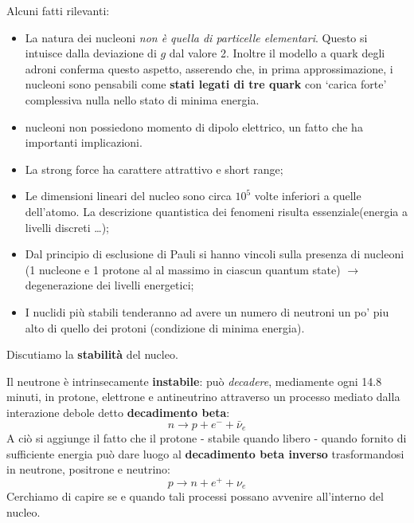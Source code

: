 Alcuni fatti rilevanti:
\begin{itemize}
    \item La natura dei nucleoni \emph{non è quella di particelle elementari}.
    Questo si intuisce dalla deviazione di $ g $ dal valore 2.
    Inoltre il modello a quark degli adroni conferma questo aspetto, asserendo che, in prima approssimazione, i
    nucleoni sono pensabili come \textbf{stati legati di tre quark} con `carica forte' complessiva nulla
    nello stato di minima energia.
    \item nucleoni non possiedono momento di dipolo elettrico, un fatto che ha importanti implicazioni.
    \item La strong force ha carattere attrattivo e short range;
    \item Le dimensioni lineari del nucleo sono circa $ {10}^{5} $ volte inferiori a quelle dell'atomo.
    La descrizione quantistica dei fenomeni risulta essenziale(energia a livelli discreti \ldots);
    \item Dal principio di esclusione di Pauli si hanno vincoli sulla presenza di nucleoni (1 nucleone e 1 protone al
    al massimo in ciascun quantum state) $ \rightarrow $ degenerazione dei livelli energetici;
    \item I nuclidi più stabili tenderanno ad avere un numero di neutroni un po' piu alto di quello dei protoni
    (condizione di minima energia).
\end{itemize}

Discutiamo la \textbf{stabilità} del nucleo.

\noindent Il neutrone è intrinsecamente \textbf{instabile}: può \emph{decadere}, mediamente ogni 14.8 minuti, in protone, elettrone
e  antineutrino attraverso un processo mediato dalla interazione debole detto \textbf{decadimento beta}:
\[
   n \to p + {e}^{-} + \bar{\nu}_e
\]
A ciò si aggiunge il fatto che il protone - stabile quando libero - quando fornito di sufficiente energia può dare luogo
al \textbf{decadimento beta inverso} trasformandosi in neutrone, positrone e neutrino:
\[
 p \to n + {e}^{+} + \nu_e
\]
Cerchiamo di capire se e quando tali processi possano avvenire all'interno del nucleo.

